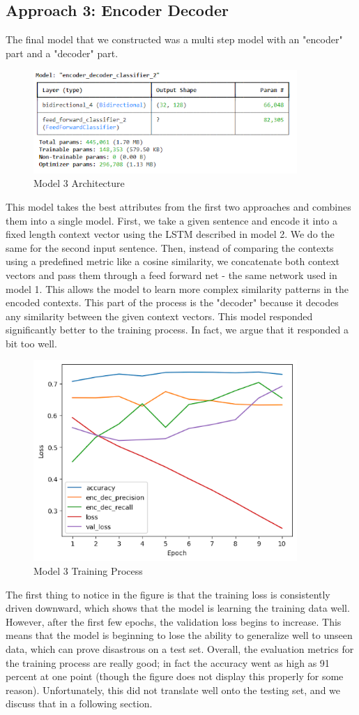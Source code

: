 \documentclass{article}
\begin{document}
\subsection{Approach 3: Encoder Decoder}
The final model that we constructed was a multi step model with an "encoder" part and a "decoder" part.
\begin{figure}[htp]
    \centering
    \includegraphics[width=10cm]{model3.png}
    \caption{Model 3 Architecture}
\end{figure}
This model takes the best attributes from the first two approaches and combines them into a single model. First, we take a given sentence and encode it into a fixed length context vector using the LSTM described in model 2. We do the same for the second input sentence. Then, instead of comparing the contexts using a predefined metric like a cosine similarity, we concatenate both context vectors and pass them through a feed forward net - the same network used in model 1. This allows the model to learn more complex similarity patterns in the encoded contexts. This part of the process is the "decoder" because it decodes any similarity between the given context vectors. This model responded significantly better to the training process. In fact, we argue that it responded a bit too well.
\begin{figure}[htp]
    \centering
    \includegraphics[width=10cm]{model3_train.png}
    \caption{Model 3 Training Process}
\end{figure}
The first thing to notice in the figure is that the training loss is consistently driven downward, which shows that the model is learning the training data well. However, after the first few epochs, the validation loss begins to increase. This means that the model is beginning to lose the ability to generalize well to unseen data, which can prove disastrous on a test set. Overall, the evaluation metrics for the training process are really good; in fact the accuracy went as high as 91 percent at one point (though the figure does not display this properly for some reason). Unfortunately, this did not translate well onto the testing set, and we discuss that in a following section.
\end{document}
